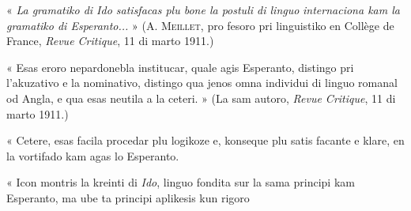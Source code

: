 \begin{VUpage}[4]{}
\VUblanc{18.32pt}« \textit{La gramatiko di Ido satisfacas plu bone la postuli di linguo}\nl
\textit{internaciona kam la gramatiko di Esperanto...} » (A. \textsc{Meillet}, pro\cc
fesoro pri linguistiko en Collège de France, \textit{Revue Critique}, 11 di\nl
marto 1911.)

\VUblanc{2.89pt}« Esas eroro nepardonebla institucar, quale agis Esperanto,\nl
distingo pri l'akuzativo e la nominativo, distingo qua jenos omna\nl
individui di linguo romanal od Angla, e qua esas neutila a la ceteri. »\nl
(La sam autoro, \textit{Revue Critique}, 11 di marto 1911.)

\VUblanc{2.89pt}« Cetere, esas facila procedar plu logikoze e, konseque plu satis\cc
facante e klare, en la vortifado kam agas lo Esperanto.

\VUblanc{2.89pt}« Icon montris la kreinti di \textit{Ido}, linguo fondita sur la sama\nl
principi kam Esperanto, ma ube ta principi aplikesis kun rigoro\nl
\end{VUpage}

%

\begin{VUpage}[5]{}
\end{VUpage}

\begin{VUpage}[6]{}
\end{VUpage}

